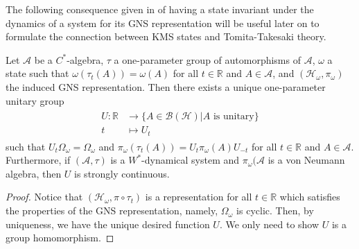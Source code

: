 The following consequence given in \cite{Duvenhage1999} of having a state invariant under the dynamics of a system for its GNS representation will be useful later on to formulate the connection between KMS states and Tomita-Takesaki theory.

\begin{theorem}
Let $\mathcal{A}$ be a $C^*$-algebra, $\tau$ a one-parameter group of automorphisms of $\mathcal{A}$, $\omega$ a state such that $\omega(\tau_t(A))=\omega(A)$ for all $t\in\mathbb{R}$ and $A\in\mathcal{A}$, and $(\mathcal{H}_\omega,\pi_\omega)$ the induced GNS representation. Then there exists a unique one-parameter unitary group
\begin{align}
\begin{split}
U:\mathbb{R}&\rightarrow\{A\in\mathcal{B}(\mathcal{H})|A\text{ is unitary}\} \\
t&\mapsto U_t
\end{split}
\end{align}
such that $U_t\Omega_\omega=\Omega_\omega$ and $\pi_\omega(\tau_t(A))=U_t\pi_\omega(A)U_{-t}$ for all $t\in\mathbb{R}$ and $A\in\mathcal{A}$. Furthermore, if $(\mathcal{A},\tau)$ is a $W^*$-dynamical system and $\pi_\omega(\mathcal{A}$ is a von Neumann algebra, then $U$ is strongly continuous.
\end{theorem} 

\begin{proof}
Notice that $(\mathcal{H}_\omega,\pi\circ\tau_t)$ is a representation for all $t\in\mathbb{R}$ which satisfies the properties of the GNS representation, namely, $\Omega_\omega$ is cyclic. Then, by uniqueness, we have the unique desired function $U$. We only need to show $U$ is a group homomorphism. 
\end{proof}